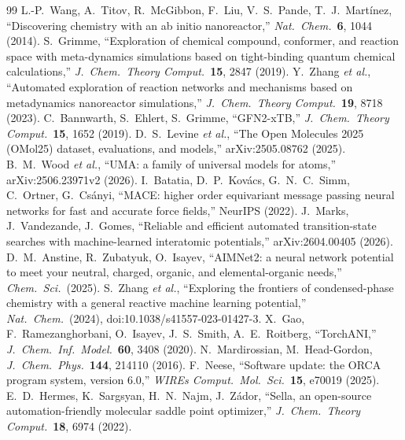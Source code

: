\documentclass[11pt]{article}
\begin{document}
\begin{thebibliography}{99}
\small
\setlength{\itemsep}{1pt}
 L.-P.~Wang, A.~Titov, R.~McGibbon, F.~Liu,
V.~S.~Pande, T.~J.~Mart\'inez, ``Discovering chemistry with an ab initio
nanoreactor,'' \emph{Nat.\ Chem.}\ \textbf{6}, 1044 (2014).
 S.~Grimme, ``Exploration of chemical compound,
conformer, and reaction space with meta-dynamics simulations based on
tight-binding quantum chemical calculations,'' \emph{J.\ Chem.\ Theory
Comput.}\ \textbf{15}, 2847 (2019).
 Y.~Zhang \emph{et al.}, ``Automated exploration of
reaction networks and mechanisms based on metadynamics nanoreactor
simulations,'' \emph{J.\ Chem.\ Theory Comput.}\ \textbf{19}, 8718
(2023).
 C.~Bannwarth, S.~Ehlert, S.~Grimme, ``GFN2-xTB,''
\emph{J.\ Chem.\ Theory Comput.}\ \textbf{15}, 1652 (2019).
 D.~S.~Levine \emph{et al.}, ``The Open Molecules 2025
(OMol25) dataset, evaluations, and models,'' arXiv:2505.08762 (2025).
 B.~M.~Wood \emph{et al.}, ``UMA: a family of universal
models for atoms,'' arXiv:2506.23971v2 (2026).
 I.~Batatia, D.~P.~Kov\'acs, G.~N.~C.~Simm, C.~Ortner,
G.~Cs\'anyi, ``MACE: higher order equivariant message passing neural
networks for fast and accurate force fields,'' NeurIPS (2022).
 J.~Marks, J.~Vandezande, J.~Gomes, ``Reliable and
efficient automated transition-state searches with machine-learned
interatomic potentials,'' arXiv:2604.00405 (2026).
 D.~M.~Anstine, R.~Zubatyuk, O.~Isayev, ``AIMNet2: a
neural network potential to meet your neutral, charged, organic, and
elemental-organic needs,'' \emph{Chem.\ Sci.}\ (2025).
 S.~Zhang \emph{et al.}, ``Exploring the frontiers of
condensed-phase chemistry with a general reactive machine learning
potential,'' \emph{Nat.\ Chem.}\ (2024), doi:10.1038/s41557-023-01427-3.
 X.~Gao, F.~Ramezanghorbani, O.~Isayev, J.~S.~Smith,
A.~E.~Roitberg, ``TorchANI,'' \emph{J.\ Chem.\ Inf.\ Model.}\
\textbf{60}, 3408 (2020).
 N.~Mardirossian, M.~Head-Gordon, \emph{J.\ Chem.\
Phys.}\ \textbf{144}, 214110 (2016).
\bibitem{orca} F.~Neese, ``Software update: the ORCA program system,
version 6.0,'' \emph{WIREs Comput.\ Mol.\ Sci.}\ \textbf{15}, e70019
(2025).
\bibitem{sella} E.~D.~Hermes, K.~Sargsyan, H.~N.~Najm, J.~Z\'ador,
``Sella, an open-source automation-friendly molecular saddle point
optimizer,'' \emph{J.\ Chem.\ Theory Comput.}\ \textbf{18}, 6974 (2022).

\end{thebibliography}
\end{document}
